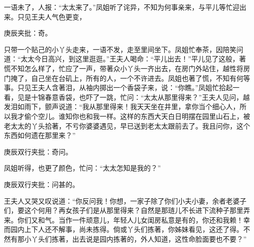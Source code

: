 \begin{parag}


    一语未了，人报：“太太来了。”凤姐听了诧异，不知为何事亲来，与平儿等忙迎出来。只见王夫人气色更变，\begin{note}庚辰夹批：奇。\end{note}只带一个贴己的小丫头走来，一语不发，走至里间坐下。凤姐忙奉茶，因陪笑问道：“太太今日高兴，到这里逛逛。”王夫人喝命：“平儿出去！”平儿见了这般，著慌不知怎么样了，忙应了一声，带著众小丫头一齐出去，在房门外站住，越性将房门掩了，自己坐在台矶上，所有的人，一个不许进去。凤姐也著了慌，不知有何等事。只见王夫人含著泪，从袖内掷出一个香袋子来，说：“你瞧。”凤姐忙拾起一看，见是十锦春意香袋，也吓了一跳，忙问：“太太从那里得来？”王夫人见问，越发泪如雨下，颤声说道：“我从那里得来！我天天坐在井里，拿你当个细心人，所以我才偷个空儿。谁知你也和我一样。这样的东西大天白日明摆在园里山石上，被老太太的丫头拾著，不亏你婆婆遇见，早已送到老太太跟前去了。我且问你，这个东西如何遗在那里来？”\begin{note}庚辰双行夹批：奇问。\end{note}凤姐听得，也更了颜色，忙问：“太太怎知是我的？”\begin{note}庚辰双行夹批：问甚的。\end{note}王夫人又哭又叹说道：“你反问我！你想，一家子除了你们小夫小妻，余者老婆子们，要这个何用？再女孩子们是从那里得来？自然是那琏儿不长进下流种子那里弄来。你们又和气。当作一件顽意儿，年轻人儿女闺房私意是有的，你还和我赖！幸而园内上下人还不解事，尚未拣得。倘或丫头们拣著，你姊妹看见，这还了得。不然有那小丫头们拣著，出去说是园内拣著的，外人知道，这性命脸面要也不要？”
\end{parag}


